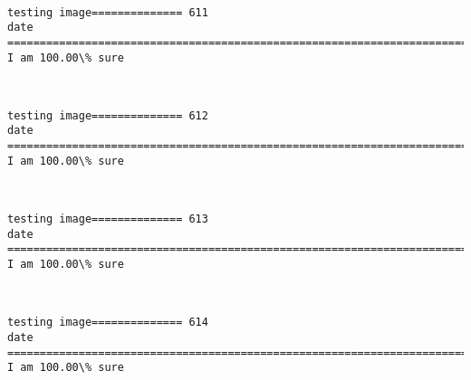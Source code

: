 \documentclass[11pt]{article}
\begin{document}
    \begin{center}
    \end{center}
    { \hspace*{\fill} \\}
    
    \begin{Verbatim}[commandchars=\\\{\}]
testing image============== 611
date
============================================================================
I am 100.00\% sure

    \end{Verbatim}

    \begin{center}
    \end{center}
    { \hspace*{\fill} \\}
    
    \begin{Verbatim}[commandchars=\\\{\}]
testing image============== 612
date
============================================================================
I am 100.00\% sure

    \end{Verbatim}

    \begin{center}
    \end{center}
    { \hspace*{\fill} \\}
    
    \begin{Verbatim}[commandchars=\\\{\}]
testing image============== 613
date
============================================================================
I am 100.00\% sure

    \end{Verbatim}

    \begin{center}
    \end{center}
    { \hspace*{\fill} \\}
    
    \begin{Verbatim}[commandchars=\\\{\}]
testing image============== 614
date
============================================================================
I am 100.00\% sure

    \end{Verbatim}
\end{document}
